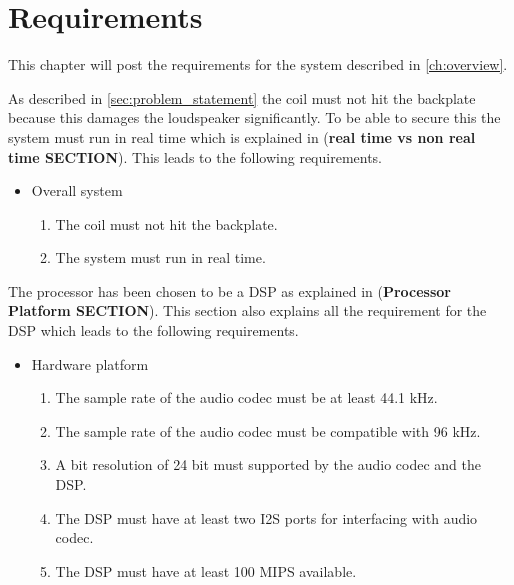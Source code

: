 \chapter{Requirements} \label{ch:requirements}
This chapter will post the requirements for the system described in \autoref{ch:overview}.  

As described in \autoref{sec:problem_statement} the coil must not hit the backplate because this damages the loudspeaker significantly. To be able to secure this the system must run in real time which is explained in (\textbf{real time vs non real time SECTION}). This leads to the following requirements.

\begin{itemize}
\item Overall system
\begin{enumerate}
\item [\textlabel{1}{coil}] The coil must not hit the backplate.\\
\item [\textlabel{2}{realtime}] The system must run in real time.
\end{enumerate}
\end{itemize}

The processor has been chosen to be a DSP as explained in (\textbf{Processor Platform SECTION}). This section also explains all the requirement for the DSP which leads to the following requirements. 

\begin{itemize}
\item Hardware platform
\begin{enumerate}
\item [\textlabel{3}{samplerate44}] The sample rate of the audio codec must be at least 44.1 kHz.\\
\item [\textlabel{4}{samplerate96}] The sample rate of the audio codec must be compatible with 96 kHz.\\
\item [\textlabel{5}{resolution}]  A bit resolution of 24 bit must supported by the audio codec and the DSP.\\
\item [\textlabel{6}{I2S}] The DSP must have at least two I2S ports for interfacing with audio codec.\\
\item [\textlabel{7}{MIPS}] The DSP must have at least 100 MIPS available.
\end{enumerate}
\end{itemize}

